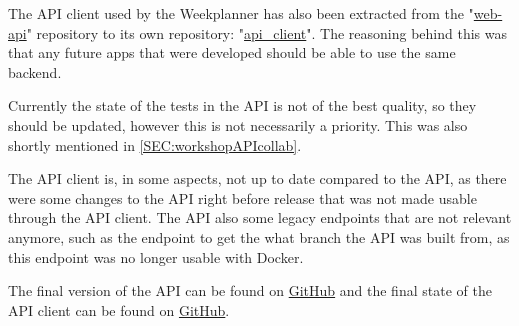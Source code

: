 The API client used by the Weekplanner has also been extracted from the "\href{https://github.com/aau-giraf/web-api/tree/2019S4R1}{web-api}" repository to its own repository: "\href{https://github.com/aau-giraf/api_client/tree/2019S4R1}{api\_client}".
The reasoning behind this was that any future apps that were developed should be able to use the same backend.

Currently the state of the tests in the API is not of the best quality, so they should be updated, however this is not necessarily a priority.
This was also shortly mentioned in \autoref{SEC:workshopAPIcollab}.

The API client is, in some aspects, not up to date compared to the API, as there were some changes to the API right before release that was not made usable through the API client.
The API also some legacy endpoints that are not relevant anymore, such as the endpoint to get the what branch the API was built from, as this endpoint was no longer usable with Docker.


The final version of the API can be found on \href{https://github.com/aau-giraf/web-api/tree/2019S4R1}{GitHub} and the final state of the API client can be found on \href{https://github.com/aau-giraf/api_client/tree/2019S4R1}{GitHub}.


